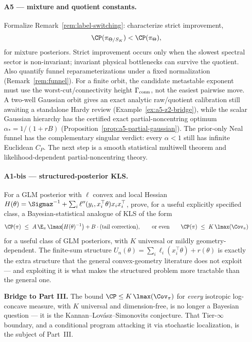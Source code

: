 \documentclass[../main.tex]{subfiles}
\begin{document}
\paragraph{A5 --- mixture and quotient constants.}
Formalize Remark~\ref{rem:label-switching}: characterize strict improvement,
\[
  \CP(\pi_{\Theta/S_K})<\CP(\pi_\Theta),
\]
for mixture posteriors. Strict improvement occurs only
when the slowest spectral sector is non-invariant; invariant physical bottlenecks can survive the
quotient. Also quantify funnel reparameterizations under a fixed normalization
(Remark~\ref{rem:funnel}).
For a finite orbit, the candidate metastable exponent must use the worst-cut/connectivity height
$\Gamma_{\rm conn}$, not the easiest pairwise move.  A two-well Gaussian orbit gives an exact
analytic raw/quotient calibration still awaiting a standalone Hardy review
(Example~\ref{ex:a5-z2-bridge}), while the scalar Gaussian hierarchy has the certified exact
partial-noncentring optimum $\alpha_*=1/(1+rB)$
(Proposition~\ref{prop:a5-partial-gaussian}).  The prior-only Neal funnel has the complementary
singular verdict: every $\alpha<1$ still has infinite Euclidean $C_P$.  The next step is a smooth
statistical multiwell theorem and likelihood-dependent partial-noncentring theory.

\paragraph{A1-bis --- structured-posterior KLS.}
\begin{conjecture}
\label{conj:a1-bis}
For a GLM posterior
with $\ell$ convex and local Hessian $H(\theta)=\Sigmaz^{-1}+\sum_i\ell''(y_i,x_i^\top\theta)x_ix_i^\top$,
prove, for a useful explicitly specified class, a Bayesian-statistical analogue of KLS of the form
\[
  \CP(\pi)\ \le\ A\,\E_\pi\,\lmax\!\big(H(\theta)^{-1}\big)+B\cdot(\text{tail correction}),
  \qquad\text{or even}\qquad
  \CP(\pi)\ \le\ K\,\lmax(\Cov_\pi)
\]
for a useful class of GLM posteriors, with $K$ universal or mildly geometry-dependent. The
finite-sum structure $U_n(\theta)=\sum_i\ell_i(x_i^\top\theta)+r(\theta)$ is exactly the extra
structure that the general convex-geometry literature does not exploit --- and exploiting it
is what makes the structured problem more tractable than the general one.
\end{conjecture}

\medskip
\noindent\textbf{Bridge to Part III.} The bound $\CP\le K\,\lmax(\Cov_\pi)$ for \emph{every}
isotropic log-concave measure, with $K$ universal and dimension-free, is no longer a Bayesian
question --- it is the Kannan--Lov\'asz--Simonovits conjecture. That Tier-$\infty$ boundary,
and a conditional program attacking it via stochastic localization, is the subject of
Part~III.
\end{document}
